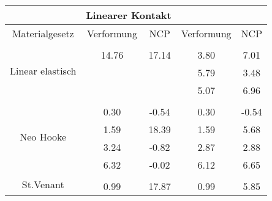 \begin{table} 
\centering 
\begin{tabular}{c|cc|cc|} 
\cline{2-5} 
 & \multicolumn{2}{|c|}{Linearer Kontakt} &  \\ 
\hline 
\multicolumn{1}{|c|}{Materialgesetz} & \multicolumn{1}{c|}{Verformung} & \multicolumn{1}{c|}{NCP} & \multicolumn{1}{c|}{Verformung} & \multicolumn{1}{c|}{NCP} \\ 
\hline 
\multicolumn{1}{|c|}{\multirow{4}{*}{Linear elastisch}} &\multicolumn{1}{|c|}{} & \multicolumn{1}{|c|}{} & \multicolumn{1}{|c|}{} & \multicolumn{1}{|c|}{} \\ 
\multicolumn{1}{|c|}{} & \multicolumn{1}{|c|}{     14.76} & \multicolumn{1}{|c|}{     17.14} & \multicolumn{1}{|c|}{      3.80} & \multicolumn{1}{|c|}{      7.01} \\ 
\multicolumn{1}{|c|}{} & \multicolumn{1}{|c|}{} & \multicolumn{1}{|c|}{} & \multicolumn{1}{|c|}{      5.79} & \multicolumn{1}{|c|}{      3.48} \\ 
\multicolumn{1}{|c|}{} & \multicolumn{1}{|c|}{} & \multicolumn{1}{|c|}{} & \multicolumn{1}{|c|}{      5.07} & \multicolumn{1}{|c|}{      6.96} \\ 
\hline 
\multicolumn{1}{|c|}{\multirow{5}{*}{Neo Hooke}} &\multicolumn{1}{|c|}{} & \multicolumn{1}{|c|}{} & \multicolumn{1}{|c|}{} & \multicolumn{1}{|c|}{} \\ 
\multicolumn{1}{|c|}{} & \multicolumn{1}{|c|}{      0.30} & \multicolumn{1}{|c|}{     -0.54} & \multicolumn{1}{|c|}{      0.30} & \multicolumn{1}{|c|}{     -0.54} \\ 
\multicolumn{1}{|c|}{} & \multicolumn{1}{|c|}{      1.59} & \multicolumn{1}{|c|}{     18.39} & \multicolumn{1}{|c|}{      1.59} & \multicolumn{1}{|c|}{      5.68} \\ 
\multicolumn{1}{|c|}{} & \multicolumn{1}{|c|}{      3.24} & \multicolumn{1}{|c|}{     -0.82} & \multicolumn{1}{|c|}{      2.87} & \multicolumn{1}{|c|}{      2.88} \\ 
\multicolumn{1}{|c|}{} & \multicolumn{1}{|c|}{      6.32} & \multicolumn{1}{|c|}{     -0.02} & \multicolumn{1}{|c|}{      6.12} & \multicolumn{1}{|c|}{      6.65} \\ 
\hline 
\multicolumn{1}{|c|}{\multirow{5}{*}{St.Venant}} &\multicolumn{1}{|c|}{} & \multicolumn{1}{|c|}{} & \multicolumn{1}{|c|}{} & \multicolumn{1}{|c|}{} \\ 
\multicolumn{1}{|c|}{} & \multicolumn{1}{|c|}{      0.99} & \multicolumn{1}{|c|}{     17.87} & \multicolumn{1}{|c|}{      0.99} & \multicolumn{1}{|c|}{      5.85} \\ 

\end{tabular}
\end{table}
